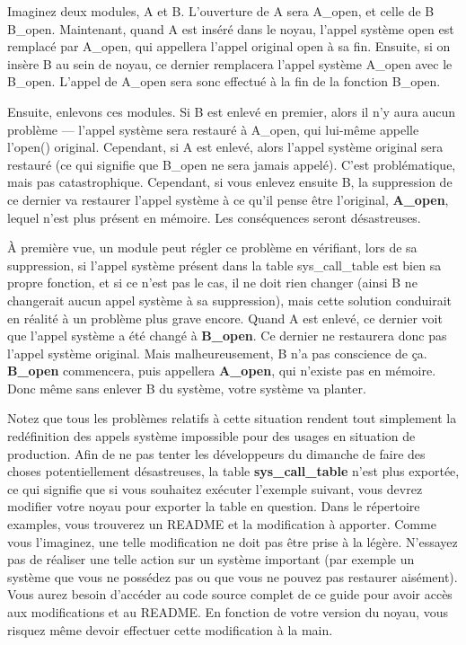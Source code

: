 \documentclass[11pt]{article}
\begin{document}
Imaginez deux modules, A et B. L'ouverture de A sera A\_open, et celle de B B\_open. Maintenant, quand A est inséré dans le noyau, l'appel système open est remplacé par A\_open, qui appellera l'appel original open à sa fin. Ensuite, si on insère B au sein de noyau, ce dernier remplacera l'appel système A\_open avec le B\_open. L'appel de A\_open sera sonc effectué à la fin de la fonction B\_open.

Ensuite, enlevons ces modules. Si B est enlevé en premier, alors il n'y aura aucun problème --- l'appel système sera restauré à A\_open, qui lui-même appelle l'open() original. Cependant, si A est enlevé, alors l'appel système original sera restauré (ce qui signifie que B\_open ne sera jamais appelé). C'est problématique, mais pas catastrophique. Cependant, si vous enlevez ensuite B, la suppression de ce dernier va restaurer l'appel système à ce qu'il pense être l'original, \textbf{A\_open}, lequel n'est plus présent en mémoire. Les conséquences seront désastreuses.

À première vue, un module peut régler ce problème en vérifiant, lors de sa suppression, si l'appel système présent dans la table sys\_call\_table est bien sa propre fonction, et si ce n'est pas le cas, il ne doit rien changer (ainsi B ne changerait aucun appel système à sa suppression), mais cette solution conduirait en réalité à un problème plus grave encore. Quand A est enlevé, ce dernier voit que l'appel système a été changé à \textbf{B\_open}. Ce dernier ne restaurera donc pas l'appel système original. Mais malheureusement, B n'a pas conscience de ça. \textbf{B\_open} commencera, puis appellera \textbf{A\_open}, qui n'existe pas en mémoire. Donc même sans enlever B du système, votre système va planter.

Notez que tous les problèmes relatifs à cette situation rendent tout simplement la redéfinition des appels système impossible pour des usages en situation de production. Afin de ne pas tenter les développeurs du dimanche de faire des choses potentiellement désastreuses, la table \textbf{sys\_call\_table} n'est plus exportée, ce qui signifie que si vous souhaitez exécuter l'exemple suivant, vous devrez modifier votre noyau pour exporter la table en question. Dans le répertoire examples, vous trouverez un README et la modification à apporter. Comme vous l'imaginez, une telle modification ne doit pas être prise à la légère. N'essayez pas de réaliser une telle action sur un système important (par exemple un système que vous ne possédez pas ou que vous ne pouvez pas restaurer aisément). Vous aurez besoin d'accéder au code source complet de ce guide pour avoir accès aux modifications et au README. En fonction de votre version du noyau, vous risquez même devoir effectuer cette modification à la main.
\end{document}
